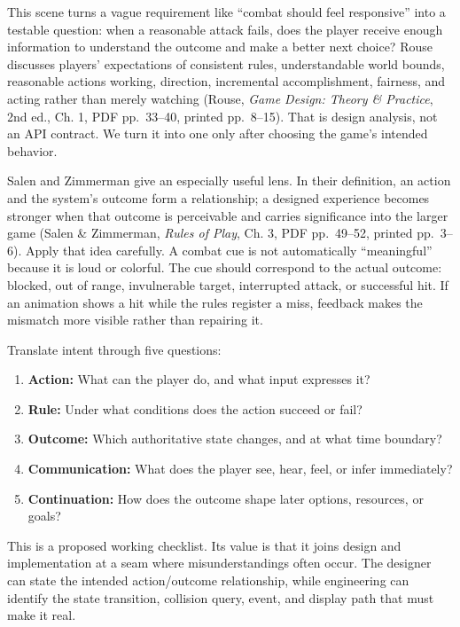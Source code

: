 This scene turns a vague requirement like ``combat should feel responsive'' into a testable question: when a reasonable attack fails, does the player receive enough information to understand the outcome and make a better next choice? Rouse discusses players' expectations of consistent rules, understandable world bounds, reasonable actions working, direction, incremental accomplishment, fairness, and acting rather than merely watching (Rouse, \emph{Game Design: Theory \& Practice}, 2nd ed., Ch. 1, PDF pp.~33--40, printed pp.~8--15). That is design analysis, not an API contract. We turn it into one only after choosing the game's intended behavior.

Salen and Zimmerman give an especially useful lens. In their definition, an action and the system's outcome form a relationship; a designed experience becomes stronger when that outcome is perceivable and carries significance into the larger game (Salen \& Zimmerman, \emph{Rules of Play}, Ch. 3, PDF pp.~49--52, printed pp.~3--6). Apply that idea carefully. A combat cue is not automatically ``meaningful'' because it is loud or colorful. The cue should correspond to the actual outcome: blocked, out of range, invulnerable target, interrupted attack, or successful hit. If an animation shows a hit while the rules register a miss, feedback makes the mismatch more visible rather than repairing it.

Translate intent through five questions:

\begin{enumerate}
\def\labelenumi{\arabic{enumi}.}
\tightlist
\item
  \textbf{Action:} What can the player do, and what input expresses it?
\item
  \textbf{Rule:} Under what conditions does the action succeed or fail?
\item
  \textbf{Outcome:} Which authoritative state changes, and at what time boundary?
\item
  \textbf{Communication:} What does the player see, hear, feel, or infer immediately?
\item
  \textbf{Continuation:} How does the outcome shape later options, resources, or goals?
\end{enumerate}

This is a proposed working checklist. Its value is that it joins design and implementation at a seam where misunderstandings often occur. The designer can state the intended action/outcome relationship, while engineering can identify the state transition, collision query, event, and display path that must make it real.

